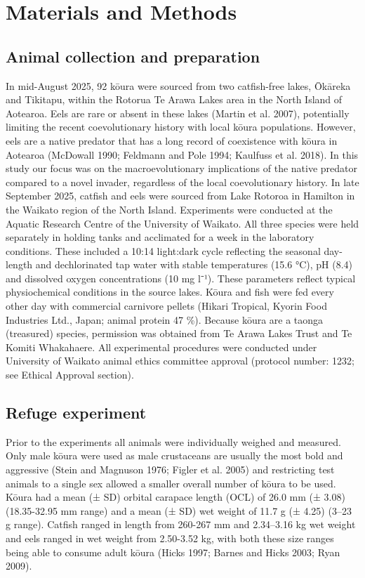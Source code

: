 \documentclass[
  12pt,
  a4paper,
]{scrbook}
\begin{document}

\chapter{Materials and Methods}\label{materials-and-methods}

\section{Animal collection and
preparation}\label{animal-collection-and-preparation}

In mid-August 2025, 92 kōura were sourced from two catfish-free lakes,
Ōkāreka and Tikitapu, within the Rotorua Te Arawa Lakes area in the
North Island of Aotearoa. Eels are rare or absent in these lakes (Martin
et al. 2007), potentially limiting the recent coevolutionary history
with local kōura populations. However, eels are a native predator that
has a long record of coexistence with kōura in Aotearoa (McDowall 1990;
Feldmann and Pole 1994; Kaulfuss et al. 2018). In this study our focus
was on the macroevolutionary implications of the native predator
compared to a novel invader, regardless of the local coevolutionary
history. In late September 2025, catfish and eels were sourced from Lake
Rotoroa in Hamilton in the Waikato region of the North Island.
Experiments were conducted at the Aquatic Research Centre of the
University of Waikato. All three species were held separately in holding
tanks and acclimated for a week in the laboratory conditions. These
included a 10:14 light:dark cycle reflecting the seasonal day-length and
dechlorinated tap water with stable temperatures (15.6 °C), pH (8.4) and
dissolved oxygen concentrations (10 mg l⁻¹). These parameters reflect
typical physiochemical conditions in the source lakes. Kōura and fish
were fed every other day with commercial carnivore pellets (Hikari
Tropical, Kyorin Food Industries Ltd., Japan; animal protein 47 \%).
Because kōura are a taonga (treasured) species, permission was obtained
from Te Arawa Lakes Trust and Te Komiti Whakahaere. All experimental
procedures were conducted under University of Waikato animal ethics
committee approval (protocol number: 1232; see Ethical Approval
section).

\section{Refuge experiment}\label{refuge-experiment}

Prior to the experiments all animals were individually weighed and
measured. Only male kōura were used as male crustaceans are usually the
most bold and aggressive (Stein and Magnuson 1976; Figler et al. 2005)
and restricting test animals to a single sex allowed a smaller overall
number of kōura to be used. Kōura had a mean (± SD) orbital carapace
length (OCL) of 26.0 mm (± 3.08) (18.35-32.95 mm range) and a mean (±
SD) wet weight of 11.7 g (± 4.25) (3--23 g range). Catfish ranged in
length from 260-267 mm and 2.34--3.16 kg wet weight and eels ranged in
wet weight from 2.50-3.52 kg, with both these size ranges being able to
consume adult kōura (Hicks 1997; Barnes and Hicks 2003; Ryan 2009).
\end{document}
